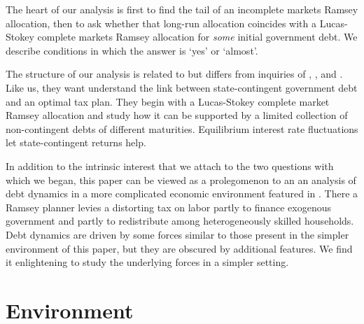 \documentclass[12pt]{article}
\begin{document}
The heart of our analysis is first to find the tail of an   incomplete markets Ramsey allocation, then to ask whether that long-run allocation coincides with a Lucas-Stokey complete markets Ramsey allocation for {\em some} initial government debt.  We describe conditions in which the
answer is `yes' or `almost'.

The structure of our analysis is related to but differs from   inquiries of \citet{Angeletos}, \citet{Buera_Nicolini}, and \citet{Shin2007}. Like us, they  want understand the link between state-contingent government  debt and an optimal tax plan. They  begin with a Lucas-Stokey complete market  Ramsey allocation
and study how it  can be supported by  a limited  collection of non-contingent debts of different maturities. Equilibrium interest rate fluctuations
let state-contingent returns help.

In addition to the intrinsic interest that we attach to the two questions with which we began, this paper can be viewed as
a prolegomenon to an an analysis of debt dynamics in a more complicated   economic environment featured in \citet{BEGS1}.  There
a Ramsey planner levies a distorting tax on labor partly to finance exogenous government  and partly to redistribute among heterogeneously skilled households.
Debt dynamics are driven by some forces similar to those present in the simpler environment of this paper, but they are obscured by
additional features.  We find it enlightening to study the underlying forces in a simpler setting.

\section{Environment}
\end{document}
